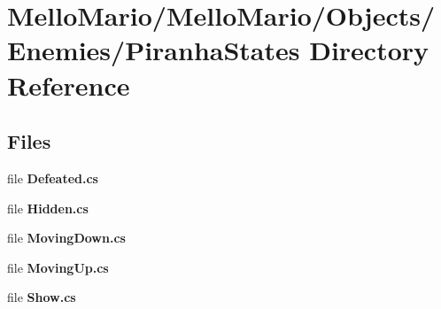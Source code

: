 \section{Mello\+Mario/\+Mello\+Mario/\+Objects/\+Enemies/\+Piranha\+States Directory Reference}
\label{dir_f56697bfac5cbb44bf60af536da9f5c6}
\subsection*{Files}
\begin{DoxyCompactItemize}
\item 
file \textbf{ Defeated.\+cs}
\item 
file \textbf{ Hidden.\+cs}
\item 
file \textbf{ Moving\+Down.\+cs}
\item 
file \textbf{ Moving\+Up.\+cs}
\item 
file \textbf{ Show.\+cs}
\end{DoxyCompactItemize}
